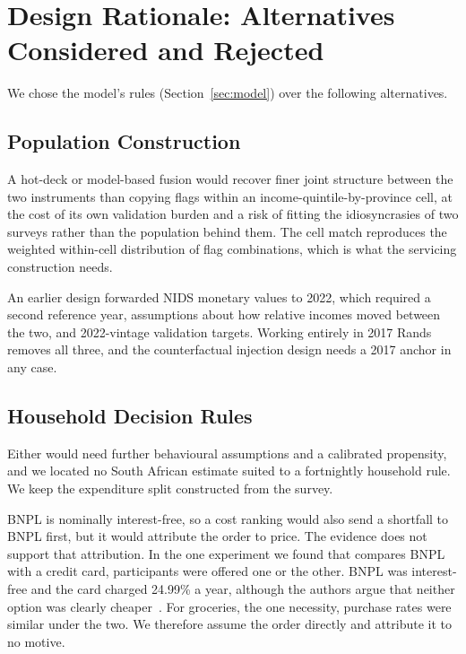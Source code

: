 \section{Design Rationale: Alternatives Considered and Rejected}
\label{app:rationale}

We chose the model's rules (Section~\ref{sec:model}) over the following alternatives.

\subsection{Population Construction}

A hot-deck or model-based fusion would
recover finer joint structure between the two instruments than copying flags within an
income-quintile-by-province cell, at the cost of its own validation burden and a risk of
fitting the idiosyncrasies of two surveys rather than the population behind them. The cell match
reproduces the weighted within-cell distribution of flag combinations, which is what the servicing
construction needs.

An earlier design forwarded \ac{NIDS} monetary values to
2022, which required a second reference year, assumptions about how relative incomes moved between
the two, and 2022-vintage validation targets. Working entirely in 2017 Rands removes all three, and
the counterfactual injection design needs a 2017 anchor in any case.

\subsection{Household Decision Rules}

Either would need further behavioural assumptions and a calibrated propensity,
and we located no South African estimate suited to a fortnightly household rule.
We keep the expenditure split constructed from the survey.

\ac{BNPL} is nominally
interest-free, so a cost ranking would also send a shortfall to \ac{BNPL} first, but it would
attribute the order to price. The evidence does not support that attribution. In the one
experiment we found that compares \ac{BNPL} with a credit card, participants were offered one
or the other. \ac{BNPL} was interest-free and the card charged 24.99\% a year, although the
authors argue that neither option was clearly cheaper~\citep{ackert2025bnpl}. For groceries, the
one necessity, purchase rates were similar under the two. We therefore assume the
order directly and attribute it to no motive.

